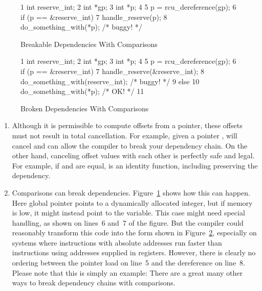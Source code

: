 \begin{figure}[tbp]
{ \scriptsize
\begin{verbbox}
 1 int reserve_int;
 2 int *gp;
 3 int *p;
 4
 5 p = rcu_dereference(gp);
 6 if (p == &reserve_int)
 7   handle_reserve(p);
 8 do_something_with(*p); /* buggy! */
\end{verbbox}
}
\centering
\theverbbox
\caption{Breakable Dependencies With Comparisons}
\label{fig:memorder:Breakable Dependencies With Comparisons}
\end{figure}

\begin{figure}[tbp]
{ \scriptsize
\begin{verbbox}
 1 int reserve_int;
 2 int *gp;
 3 int *p;
 4
 5 p = rcu_dereference(gp);
 6 if (p == &reserve_int) {
 7   handle_reserve(&reserve_int);
 8   do_something_with(reserve_int); /* buggy! */
 9 } else {
10   do_something_with(*p); /* OK! */
11 }
\end{verbbox}
}
\centering
\theverbbox
\caption{Broken Dependencies With Comparisons}
\label{fig:memorder:Broken Dependencies With Comparisons}
\end{figure}

\begin{enumerate}
\item	Although it is permissible to compute offsets from a
	pointer, these offsets must not result in total cancellation.
	For example, given a  pointer ,
	 will cancel and can allow the compiler
	to break your dependency chain.
	On the other hand, canceling offset values with each other
	is perfectly safe and legal.
	For example, if  and  are equal, 
	is an identity function, including preserving the dependency.
\item	Comparisons can break dependencies.
	Figure~\ref{fig:memorder:Breakable Dependencies With Comparisons}
	shows how this can happen.
	Here global pointer  points to a dynamically allocated
	integer, but if memory is low, it might instead point to
	the  variable.
	This  case might need special handling, as
	shown on lines~6 and~7 of the figure.
	But the compiler could reasonably transform this code into
	the form shown in
	Figure~\ref{fig:memorder:Broken Dependencies With Comparisons},
	especially on systems where instructions with absolute
	addresses run faster than instructions using addresses
	supplied in registers.
	However, there is clearly no ordering between the pointer
	load on line~5 and the dereference on line~8.
	Please note that this is simply an example: There are a great
	many other ways to break dependency chains with comparisons.
\end{enumerate}


